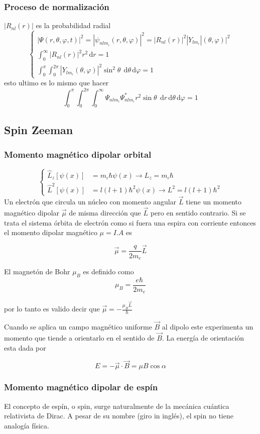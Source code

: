 \documentclass[10pt,twocolumn,titlepage]{article}
\newcommand{\psix}{\psi (x)}
\newcommand{\di}{\,\textrm{d}}
\newcommand{\nqm}{ m_{\iota} }
\newcommand{\nql}{l}
\newcommand{\nqn}{n}
\begin{document}
\subsubsection*{Proceso de normalización}
$|R_{\nqn\nql}(r)|$ es la probabilidad radial
$$
\begin{cases}
|\Psi(r,\theta,\varphi,t)|^2\!=\!|\psi_{\nqn\nql\nqm}(r,\theta,\varphi)|^2\!=\!|R_{\nqn\nql}(r)|^2|Y_{\nql\nqm}|(\theta,\varphi)|^2\\
\int^\infty_0|R_{\nqn\nql}(r)|^2 r^2 \di r=1 \\
\int^\pi_0\int^{2\pi}_0|Y_{\nql\nqm}(\theta,\varphi)|^2\sin^2\theta\; \di \theta \di \varphi =1
\end{cases}
$$
esto ultimo es lo mismo que hacer
$$ \int^\pi_0\int^{2\pi}_0\int^\infty_0\Psi_{\nqn\nql\nqm}\Psi^*_{\nqn\nql\nqm}r^2 \sin\theta\; \di r \di \theta \di \varphi=1$$
 
\subsection{Spin Zeeman}
\subsubsection*{Momento magnético dipolar orbital}
\[ \begin{cases}
\hat{L}_z[\psix]&=\nqm\hbar \psix\rightarrow L_z=\nqm\hbar\\
\hat{L}^2[\psix]&=\nql(\nql+1)\hbar^2\psix \rightarrow L^2=\nql(\nql+1)\hbar^2
\end{cases}
\]
Un electrón que circula un núcleo con momento angular $\vec{L}$ tiene un momento magnético dipolar $\vec{\mu}$ de misma dirección que $\vec{L}$ pero en sentido contrario. Si se trata el sistema órbita de electrón como si fuera una espira con corriente entonces el momento dipolar magnético $\mu=I.A$ es

$$\vec{\mu}=\frac{q}{2m_e}\vec{L} $$

El magnetón de Bohr $\mu_B$ es definido como
$$\mu_B=\frac{e\hbar}{2m_e} $$

por lo tanto es valido decir que $\vec{\mu}=-\frac{\mu_B\vec{L}}{\hbar}$

Cuando se aplica un campo magnético uniforme $\vec{B}$ al dipolo este experimenta un momento que tiende a orientarlo en el sentido de $\vec{B}$. La energía de orientación esta dada por

$$E=-\vec{\mu}\cdot\vec{B}=\mu B\cos \alpha $$

\subsubsection*{Momento magnético dipolar de espín}
El concepto de espín, o spin, surge naturalmente de la mecánica cuántica relativista de Dirac. A pesar de su nombre (giro in inglés), el spin no tiene analogía física.
\end{document}
